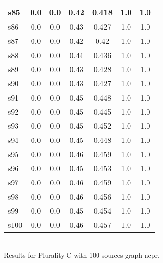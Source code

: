 \documentclass{article}
\begin{document}
\begin{tabular}{|l|c|c|c|c|c|c|}
\hline
s85 &0.0 & 0.0 & 0.42 & 0.418 & 1.0 & 1.0\\
\hline
s86 &0.0 & 0.0 & 0.43 & 0.427 & 1.0 & 1.0\\
\hline
s87 &0.0 & 0.0 & 0.42 & 0.42 & 1.0 & 1.0\\
\hline
s88 &0.0 & 0.0 & 0.44 & 0.436 & 1.0 & 1.0\\
\hline
s89 &0.0 & 0.0 & 0.43 & 0.428 & 1.0 & 1.0\\
\hline
s90 &0.0 & 0.0 & 0.43 & 0.427 & 1.0 & 1.0\\
\hline
s91 &0.0 & 0.0 & 0.45 & 0.448 & 1.0 & 1.0\\
\hline
s92 &0.0 & 0.0 & 0.45 & 0.445 & 1.0 & 1.0\\
\hline
s93 &0.0 & 0.0 & 0.45 & 0.452 & 1.0 & 1.0\\
\hline
s94 &0.0 & 0.0 & 0.45 & 0.448 & 1.0 & 1.0\\
\hline
s95 &0.0 & 0.0 & 0.46 & 0.459 & 1.0 & 1.0\\
\hline
s96 &0.0 & 0.0 & 0.45 & 0.453 & 1.0 & 1.0\\
\hline
s97 &0.0 & 0.0 & 0.46 & 0.459 & 1.0 & 1.0\\
\hline
s98 &0.0 & 0.0 & 0.46 & 0.456 & 1.0 & 1.0\\
\hline
s99 &0.0 & 0.0 & 0.45 & 0.454 & 1.0 & 1.0\\
\hline
s100 &0.0 & 0.0 & 0.46 & 0.457 & 1.0 & 1.0\\
\hline
\end{tabular}\\

\noindent Results for Plurality C with 100 sources graph ncpr.
\end{document}
